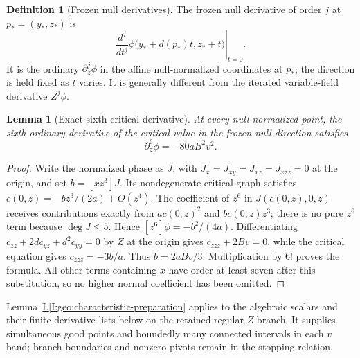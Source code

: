 \documentclass[11pt]{amsart}
\newtheorem{lemma}[theorem]{Lemma}
\theoremstyle{definition}
\newtheorem{definition}{Definition}[section]
\theoremstyle{remark}
\numberwithin{equation}{section}
\newcommand{\partIref}[1]{\hyperref[I:#1]{I.\ref*{I:#1}}}
\begin{document}
\begin{definition}[Frozen null derivatives]\label{def:frozen-null}
The frozen null derivative of order $j$ at $p_*=(y_*,z_*)$ is
\[
\left.\frac{d^j}{dt^j}\phi\bigl(y_*+d(p_*)t,z_*+t\bigr)\right|_{t=0}.
\]
It is the ordinary $\partial_z^j\phi$ in the affine null-normalized coordinates at $p_*$; the direction is held fixed as $t$ varies. It is generally different from the iterated variable-field derivative $Z^j\phi$.
\end{definition}
\begin{lemma}[Exact sixth critical derivative]\label{low:5:qnt:sixth}
At every null-normalized point, the sixth ordinary derivative of the critical value in the frozen null direction satisfies
\[
\partial_z^6\phi=-80aB^2v^2.
\]
\end{lemma}
\begin{proof}
Write the normalized phase as $J$, with $J_x=J_{xy}=J_{xz}=J_{xzz}=0$ at the origin, and set $b=[xz^3]J$. Its nondegenerate critical graph satisfies $c(0,z)=-b z^3/(2a)+O(z^4)$. The coefficient of $z^6$ in $J(c(0,z),0,z)$ receives contributions exactly from $a c(0,z)^2$ and $b c(0,z)z^3$; there is no pure $z^6$ term because $\deg J\le5$. Hence $[z^6]\phi=-b^2/(4a)$. Differentiating $c_{zz}+2dc_{yz}+d^2c_{yy}=0$ by $Z$ at the origin gives $c_{zzz}+2Bv=0$, while the critical equation gives $c_{zzz}=-3b/a$. Thus $b=2aBv/3$. Multiplication by $6!$ proves the formula. All other terms containing $x$ have order at least seven after this substitution, so no higher normal coefficient has been omitted.
\end{proof}

Lemma~\partIref{geo:characteristic-preparation} applies to the algebraic scalars and their finite derivative lists below on the retained regular $Z$-branch. It supplies simultaneous good points and boundedly many connected intervals in each $v$ band; branch boundaries and nonzero pivots remain in the stopping relation.
\end{document}
